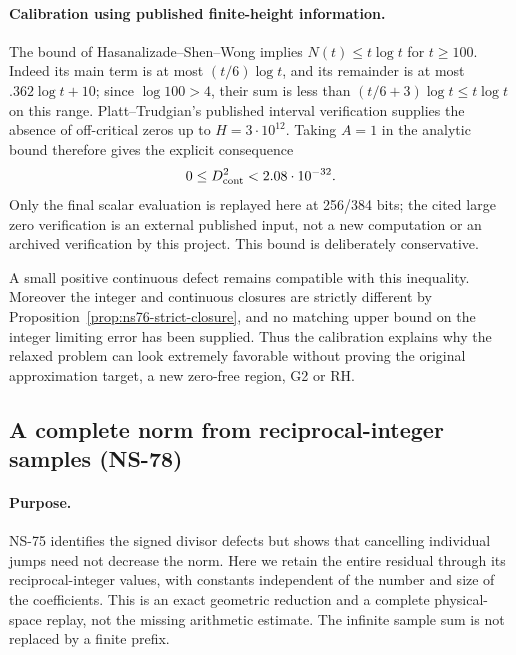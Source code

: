 \documentclass[11pt]{article}
\theoremstyle{remark}
\begin{document}
\paragraph{Calibration using published finite-height information.}
The bound of Hasanalizade--Shen--Wong
\cite[Corollary 1.2]{HasanalizadeShenWong2021} implies
$N(t)\leq t\log t$ for $t\geq100$. Indeed its main term is at most
$(t/6)\log t$, and its remainder is at most
$.362\log t+10$; since $\log100>4$, their sum is less than
$(t/6+3)\log t\leq t\log t$ on this range.
Platt--Trudgian's published interval verification
\cite[Theorem 1]{PlattTrudgian2021} supplies the absence of off-critical
zeros up to $H=3\cdot10^{12}$. Taking $A=1$ in the analytic bound
therefore gives the explicit consequence
\begin{equation}
 0\leq D_{\rm cont}^2<2.08\cdot10^{-32}.
 \label{eq:ns77-published-calibration}
\end{equation}
Only the final scalar evaluation is replayed here at 256/384 bits;
the cited large zero verification is an external published input,
not a new computation or an archived verification by this project.
This bound is deliberately conservative.

A small positive continuous defect remains compatible with this
inequality. Moreover the integer and continuous closures are strictly
different by Proposition~\ref{prop:ns76-strict-closure}, and no matching
upper bound on the integer limiting error has been supplied.
Thus the calibration explains why the relaxed problem can look
extremely favorable without proving the original approximation target,
a new zero-free region, G2 or RH.

\subsection{A complete norm from reciprocal-integer samples (NS-78)}
\label{sec:ns78-sampling}

\paragraph{Purpose.}
NS-75 identifies the signed divisor defects but shows that cancelling
individual jumps need not decrease the norm. Here we retain the entire
residual through its reciprocal-integer values, with constants independent
of the number and size of the coefficients. This is an exact geometric
reduction and a complete physical-space replay, not the missing arithmetic
estimate. The infinite sample sum is not replaced by a finite prefix.
\end{document}
